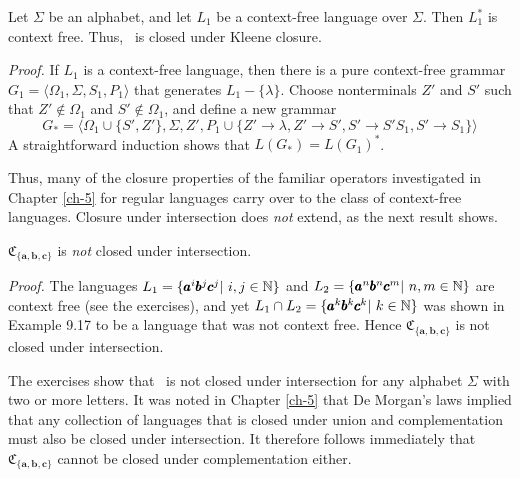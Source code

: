 \begin{thm}\label{thm-9.14}
Let $\Sigma$ be an alphabet, and let $L_1$ be a context-free language over
$\Sigma$. Then $L^*_1$ is context free. Thus, \CSIG\ is closed under Kleene
closure.

\emph{Proof.} If $L_1$ is a context-free language, then there is a pure
context-free grammar $G_1 = \langle\Omega_1,\Sigma,S_1,P_1\rangle$ that
generates $L_1 - \{\lambda\}$. Choose nonterminals $Z'$ and $S'$ such that $Z'
\not \in\Omega_1$ and $S'\not \in\Omega_1$, and define a new grammar
\[ G_* = \langle\Omega_1\cup\{S',Z'\},\Sigma,Z',P_1\cup\{Z'\rightarrow\lambda,Z'
	\rightarrow S',S'\rightarrow S'S_1,S'\rightarrow S_1\}\rangle \]
A straightforward induction shows that $L(G_*) = L(G_1)^*$.
\end{thm}

Thus, many of the closure properties of the familiar operators investigated in
Chapter \ref{ch-5} for regular languages carry over to the class of context-free
languages. Closure under intersection does \emph{not} extend, as the next result shows.

\begin{lmm}\label{lmm-9.3}
$\mathfrak{C}_{\{\pmb{a},\pmb{b},\pmb{c}\}}$ is \emph{not} closed under intersection.

\emph{Proof.} The languages $L_1=\{\pmb{a}^i\pmb{b}^j\pmb{c}^j|\ i,j\in\NN\}$ and
$L_2=\{\pmb{a}^n\pmb{b}^n\pmb{c}^m|\ n,m\in\NN\}$ are context free (see the
exercises), and yet $L_1 \cap L_2 = \{\pmb{a}^k\pmb{b}^k\pmb{c}^k|\ k\in\NN\}$ was
shown in Example 9.17 to be a language that was not context free. Hence
$\mathfrak{C}_{\{\pmb{a},\pmb{b}, \pmb{c}\}}$ is not closed under intersection.
\end{lmm}

The exercises show that \CSIG\ is not closed under intersection for any alphabet
$\Sigma$ with two or more letters. It was noted in Chapter \ref{ch-5} that De Morgan's laws
implied that any collection of languages that is closed under union and
complementation must also be closed under intersection. It therefore follows
immediately that $\mathfrak{C}_{\{\pmb{a},\pmb{b},\pmb{c}\}}$ cannot be closed
under complementation either.


